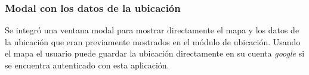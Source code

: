 \subsubsection{Modal con los datos de la ubicación}
Se integró una ventana modal para mostrar directamente el mapa y los datos de la ubicación que eran previamente mostrados en el módulo de ubicación. Usando el mapa el usuario puede guardar la ubicación directamente en su cuenta \emph{google} si se encuentra autenticado con esta aplicación.

